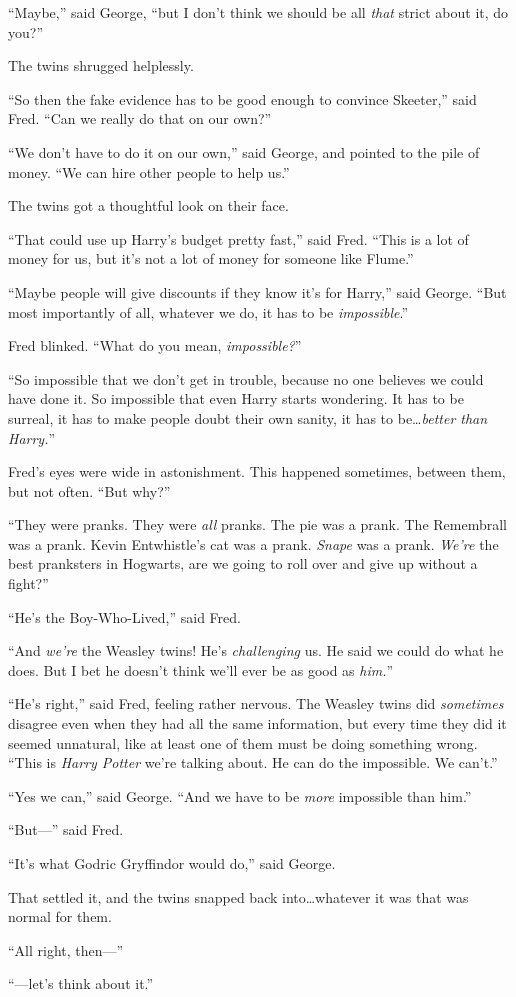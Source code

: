 “Maybe,” said George, “but I don’t think we should be all \emph{that} strict about it, do you?”

The twins shrugged helplessly.

“So then the fake evidence has to be good enough to convince Skeeter,” said Fred. “Can we really do that on our own?”

“We don’t have to do it on our own,” said George, and pointed to the pile of money. “We can hire other people to help us.”

The twins got a thoughtful look on their face.

“That could use up Harry’s budget pretty fast,” said Fred. “This is a lot of money for us, but it’s not a lot of money for someone like Flume.”

“Maybe people will give discounts if they know it’s for Harry,” said George. “But most importantly of all, whatever we do, it has to be \emph{impossible}.”

Fred blinked. “What do you mean, \emph{impossible?}”

“So impossible that we don’t get in trouble, because no one believes we could have done it. So impossible that even Harry starts wondering. It has to be surreal, it has to make people doubt their own sanity, it has to be…\emph{better than Harry.}”

Fred’s eyes were wide in astonishment. This happened sometimes, between them, but not often. “But why?”

“They were pranks. They were \emph{all} pranks. The pie was a prank. The Remembrall was a prank. Kevin Entwhistle’s cat was a prank. \emph{Snape} was a prank. \emph{We’re} the best pranksters in Hogwarts, are we going to roll over and give up without a fight?”

“He’s the Boy-Who-Lived,” said Fred.

“And \emph{we’re} the Weasley twins! He’s \emph{challenging} us. He said we could do what he does. But I bet he doesn’t think we’ll ever be as good as \emph{him.}”

“He’s right,” said Fred, feeling rather nervous. The Weasley twins did \emph{sometimes} disagree even when they had all the same information, but every time they did it seemed unnatural, like at least one of them must be doing something wrong. “This is \emph{Harry Potter} we’re talking about. He can do the impossible. We can’t.”

“Yes we can,” said George. “And we have to be \emph{more} impossible than him.”

“But—” said Fred.

“It’s what Godric Gryffindor would do,” said George.

That settled it, and the twins snapped back into…whatever it was that was normal for them.

“All right, then—”

“—let’s think about it.”

